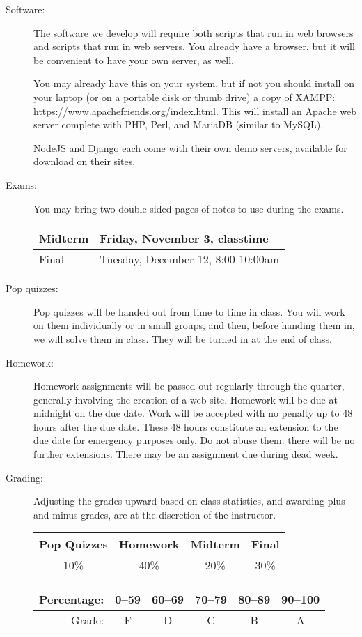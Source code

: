 \documentclass{article}
\begin{document}
\begin{description}
  
\item[Software:] The software we develop will require both
  scripts that run in web browsers and scripts that run in web
  servers.  You already have a browser, but it will be convenient to
  have your own server, as well.

  You may already have this on your system, but if not you should
  install on your laptop (or on a portable disk or thumb drive) a copy
  of XAMPP: \url{https://www.apachefriends.org/index.html}.  This will
  install an Apache web server complete with PHP, Perl, and MariaDB
  (similar to MySQL).

  NodeJS and Django each come with their own demo servers, available
  for download on their sites.

\item[Exams:]   You may bring two
  double-sided pages of notes to use during the exams.

  \begin{tabular}{|l|l|}\hline
    Midterm &  Friday, November 3, classtime  \\\hline
Final   & Tuesday, December 12, 8:00-10:00am \\\hline
    \end{tabular}

\item[Pop quizzes:]  Pop quizzes will be handed out from time to
  time in class.  You will work on them individually or in small
  groups, and then, before handing them in, we will solve them in
  class.  They will be turned in at the end of class.

\item[Homework:] Homework assignments will be passed out regularly
  through the quarter, generally involving the creation of a web site.
  Homework will be due at midnight on the due date.  Work will be
  accepted with no penalty up to 48 hours after the due date.  These
  48 hours constitute an extension to the due date for emergency
  purposes only.  Do not abuse them: there will be no further
  extensions.  There may be an assignment due during dead week.

\item[Grading:]  Adjusting the grades upward based on class
  statistics, and awarding plus and minus grades, are at the
  discretion of the instructor.

\begin{tabular}{|c|c|c|c|}\hline
Pop Quizzes & Homework  & Midterm & Final\\\hline
10\% & 40\% & 20\% & 30\%\\\hline
\end{tabular}\hfill
  \begin{tabular}{|r|c|c|c|c|c|}\hline
    Percentage: & 0--59 & 60--69 & 70--79 & 80--89 & 90--100\\\hline
    Grade: & F & D & C & B & A \\\hline
    \end{tabular}


\end{description}
\end{document}

